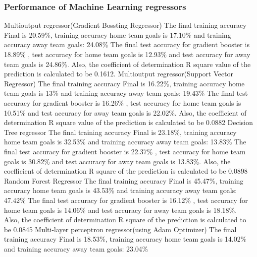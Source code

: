 \subsubsection{Performance of Machine Learning regressors}
Multioutput regressor(Gradient Bossting Regressor)\newline
The final training accuracy Final is 20.59\%, training accuracy home team goals is 17.10\% and training accuracy away team goals: 24.08\% \newline
The final test accuracy for gradient booster is 18.89\% , test accuracy for home team goals is 12.93\% and test accuracy for away team goals is 24.86\%. Also, the coefficient of determination R square value of the prediction is calculated to be 0.1612.\newline
Multioutput regressor(Support Vector Regressor)\newline
The final training accuracy Final is 16.22\%, training accuracy home team goals is 13\% and training accuracy away team goals: 19.43\% \newline
The final test accuracy for gradient booster is 16.26\% , test accuracy for home team goals is 10.51\% and test accuracy for away team goals is 22.02\%. Also, the coefficient of determination R square value of the prediction is calculated to be 0.0882 \newline
Decision Tree regressor\newline
The final training accuracy Final is 23.18\%, training accuracy home team goals is 32.53\% and training accuracy away team goals: 13.83\% \newline
The final test accuracy for gradient booster is 22.37\% , test accuracy for home team goals is 30.82\% and test accuracy for away team goals is 13.83\%. Also, the coefficient of determination R square of the prediction is calculated to be 0.0898\newline 
Random Forest Regressor\newline
The final training accuracy Final is 45.47\%, training accuracy home team goals is 43.53\% and training accuracy away team goals: 47.42\% \newline
The final test accuracy for gradient booster is 16.12\% , test accuracy for home team goals is 14.06\% and test accuracy for away team goals is 18.18\%. Also, the coefficient of determination R square of the prediction is calculated to be 0.0845 \newline 
Multi-layer perceptron regressor(using Adam Optimizer)\newline
The final training accuracy Final is 18.53\%, training accuracy home team goals is 14.02\% and training accuracy away team goals: 23.04\% \newline
